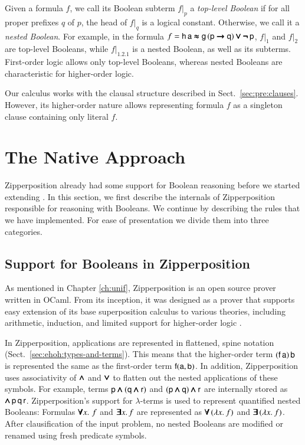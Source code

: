 Given a formula $f$, we call its Boolean subterm $f|_p$ a \emph{top-level
Boolean} if for all proper prefixes $q$ of $p$, the head of $f|_q$ is a logical
constant. Otherwise, we call it a \emph{nested Boolean}. For example, in the
formula $f = \mathsf{h} \, \mathsf{a} \pmb{\approx} \mathsf{g} \, (\mathsf{p} \pmb{\rightarrow} \mathsf{q}) \pmb{\lor}
\pmb{\neg\,}\mathsf{p}$, $f|_1$ and $f|_2$ are top-level Booleans, while $f|_{1.2.1}$ is a
nested Boolean, as well as its subterms. First-order logic allows only top-level
Booleans, whereas nested Booleans are characteristic for higher-order logic. 

Our calculus works with the clausal structure described in Sect.~\ref{sec:pre:clauses}.
However, its higher-order nature allows representing formula $f$ as a singleton clause
containing only literal $f$.

\section{The Native Approach} 
\label{sect:bool:native}

Zipperposition already had some support for Boolean reasoning before we
started extending \lsup{}. In this section, we first
describe the internals of Zipperposition responsible for reasoning with
Booleans. We continue by describing the rules that we have
implemented. For ease of presentation we divide them into three categories.
\subsection{Support for Booleans in Zipperposition}
\label{subsect:bool:zip-bools}

As mentioned in Chapter \ref{ch:unif}, Zipperposition is an open source prover
written in OCaml. From its inception, it was designed as a prover that supports
easy extension of its base superposition calculus to various theories, including
arithmetic, induction, and limited support for higher-order logic
\cite{sc-15-simon-phd,sc-supind-17}.

In Zipperposition, applications are represented in flattened, spine notation (Sect.~\ref{sec:ehoh:types-and-terms}).
This means that the higher-order term $(\mathsf{f} \, \mathsf{a}) \, \mathsf{b}$ is
represented the same as the first-order term $\mathsf{f}(\mathsf{a}, \mathsf{b})$. In
addition, Zipperposition uses associativity of $\pmb{\land}$ and $\pmb{\lor}$ to flatten out
the nested applications of these symbols. For example, terms $\mathsf{p} \pmb{\land}
(\mathsf{q} \pmb{\land} \mathsf{r})$ and $(\mathsf{p} \pmb{\land} \mathsf{q}) \pmb{\land} \mathsf{r}$ are
internally stored as $\pmb{\land} \, \mathsf{p} \, \mathsf{q} \, \mathsf{r}$. Zipperposition's
support for $\lambda$-terms is used to represent quantified nested Booleans:
Formulas $\pmb{\forall} x. \, \, f$ and $\pmb{\exists} x. \, f$ are represented as
$\pmb{\forall} \, (\lambda x.\> f)$ and $\pmb{\exists} \, (\lambda x.\> f)$. After clausification of
the input problem, no nested Booleans are modified or renamed using fresh
predicate symbols.

